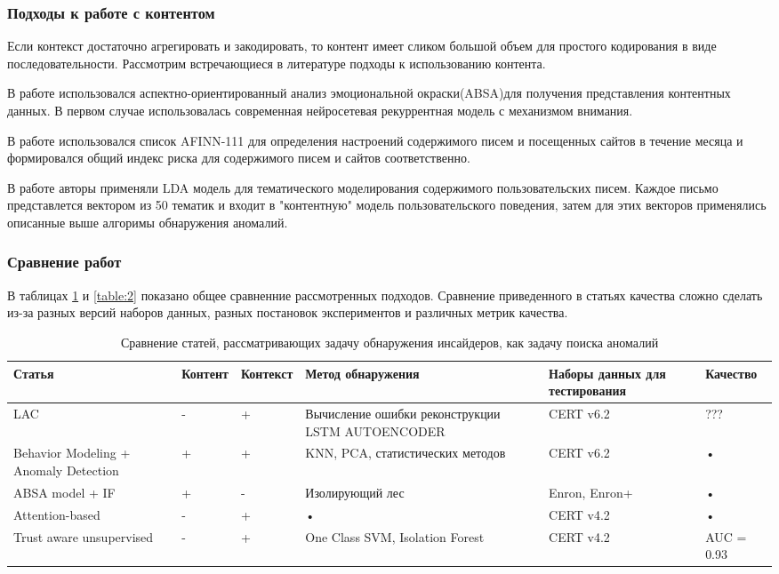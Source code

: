\subsubsection{Подходы к работе с контентом}

Если контекст достаточно агрегировать и закодировать, то контент имеет сликом большой объем для простого кодирования в виде последовательности. Рассмотрим встречающиеся в литературе подходы к использованию контента.

В работе \cite{absa} использовался аспектно-ориентированный анализ эмоциональной окраски(ABSA)для получения представления контентных данных. В первом случае использовалась современная нейросетевая рекуррентная модель с механизмом внимания.

В работе \cite{suites} использовался список AFINN-111 для определения настроений\cite{nielsen11} содержимого писем и посещенных сайтов в течение месяца и формировался общий индекс риска для содержимого писем и сайтов соответственно.

В работе \cite{anomalyalgo} авторы применяли LDA модель для тематического моделирования содержимого пользовательских писем. Каждое письмо представлется вектором из 50 тематик и входит в "контентную" модель пользовательского поведения, затем для этих векторов применялись описанные выше алгоримы обнаружения аномалий.

\subsubsection{Сравнение работ}
В таблицах \ref{table:1} и \ref{table:2} показано общее сравненние рассмотренных подходов. Сравнение приведенного в статьях качества сложно сделать из-за разных версий наборов данных, разных постановок экспериментов и различных метрик качества.

\begin{table}[!h]
\caption{Сравнение статей, рассматривающих задачу обнаружения инсайдеров, как задачу поиска аномалий}
\label{table:1} 
\begin{tabular}{|m{2cm}|m{2cm}|m{2cm}|m{2cm}|p{2cm}|p{2cm}|}
\hline 
Статья & Контент & Контекст & Метод обнаружения & Наборы данных для тестирования & Качество \\ 
\hline 
LAC\cite{lac} & - & + & Вычисление ошибки реконструкции LSTM AUTOENCODER& CERT v6.2 & ??? \\ 
\hline 
Behavior Modeling + Anomaly Detection \cite{anomalyalgo} & + & + & KNN, PCA, статистических методов & CERT v6.2 & • \\ 
\hline 
ABSA model + IF \cite{absa} & + & - & Изолирующий лес & Enron, Enron+ & • \\ 
\hline 
Attention-based \cite{attention} & - & + & • & CERT v4.2 & • \\ 
\hline 
Trust aware unsupervised \cite{ocsvm} & - & + & One Class SVM, Isolation Forest & CERT v4.2 & AUC = 0.93 \\ 
\hline 
\end{tabular}
\end{table}

